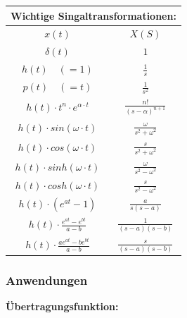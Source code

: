     \begin{center}
        {\renewcommand{\arraystretch}{1.4}
        \begin{tabular}{c|c}
        \multicolumn{2}{l}{\textbf{Wichtige Singaltransformationen:}}\\
            \hline
            $x(t)$ & $X(S)$ \\
        \hline
            $\delta(t)$ & $1$\\
            $h(t)\quad(=1)$ & $\frac{1}{s}$ \\
            $p(t)\quad(=t)$ & $\frac{1}{s^2}$ \\
            $h(t) \cdot t^n \cdot e^{\alpha\cdot t}$ & $\frac{n!}{(s-\alpha)^{n+1}}$ \\
            $h(t) \cdot sin(\omega\cdot t)$ & $\frac{\omega}{s^2 + \omega^2}$\\
            $h(t) \cdot cos(\omega\cdot t)$ & $\frac{s}{s^2+\omega^2}$\\
            $h(t)\cdot sinh(\omega\cdot t)$ & $\frac{\omega}{s^2-\omega^2}$\\
            $h(t) \cdot cosh(\omega\cdot t)$ & $\frac{s}{s^2-\omega^2}$\\
            $h(t) \cdot (e^{at}-1)$&$ \frac{a}{s(s-a)}$\\
            $h(t) \cdot \frac{e^{at} - e^{bt}}{a-b}$ & $ \frac{1}{(s-a)(s-b)}$ \\
            $h(t) \cdot \frac{ae^{at} - be^{bt}}{a-b}$ & $ \frac{s}{(s-a)(s-b)}$
        \end{tabular}} 
    \end{center}
    
        \subsubsection{Anwendungen}
            \textbf{Übertragungsfunktion:}
            

